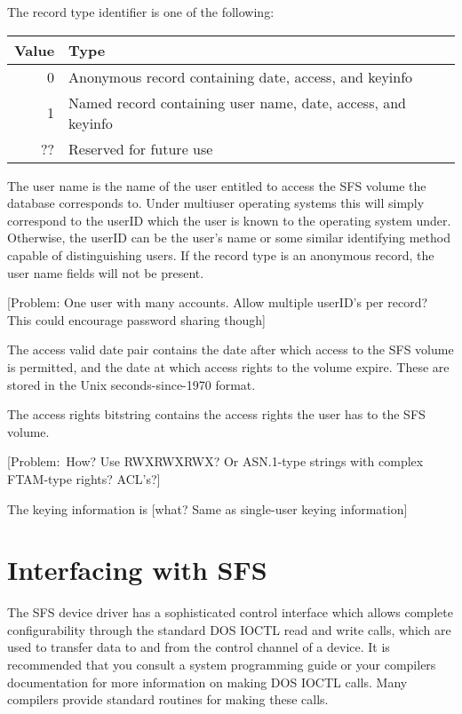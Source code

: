The record type identifier is one of the following:

\begin{center}
\begin{tabular}{|r|l|}
\hline
    Value &  Type\\
\hline
      0   &  Anonymous record containing date, access, and keyinfo\\
      1   &  Named record containing user name, date, access, and keyinfo\\
     ??   &  Reserved for future use\\
\hline
\end{tabular}
\end{center}

The user name is the name of the user entitled to access the SFS volume the
database corresponds to.  Under multiuser operating systems this will simply
correspond to the userID which the user is known to the operating system under.
Otherwise, the userID can be the user's name or some similar identifying method
capable of distinguishing users.  If the record type is an anonymous record,
the user name fields will not be present.

[Problem: One user with many accounts.  Allow multiple userID's per record?
          This could encourage password sharing though]

The access valid date pair contains the date after which access to the SFS
volume is permitted, and the date at which access rights to the volume expire.
These are stored in the Unix seconds-since-1970 format.

The access rights bitstring contains the access rights the user has to the SFS
volume.

[Problem:~How?  Use RWXRWXRWX?  Or ASN.1-type strings with complex
          FTAM-type rights?  ACL's?]

The keying information is [what?  Same as single-user keying information]


\section{Interfacing with SFS}

The SFS device driver has a sophisticated control interface which allows
complete configurability through the standard DOS IOCTL read and write calls,
which are used to transfer data to and from the control channel of a device.
It is recommended that you consult a system programming guide or your compilers
documentation for more information on making DOS IOCTL calls.  Many compilers
provide standard routines for making these calls.


